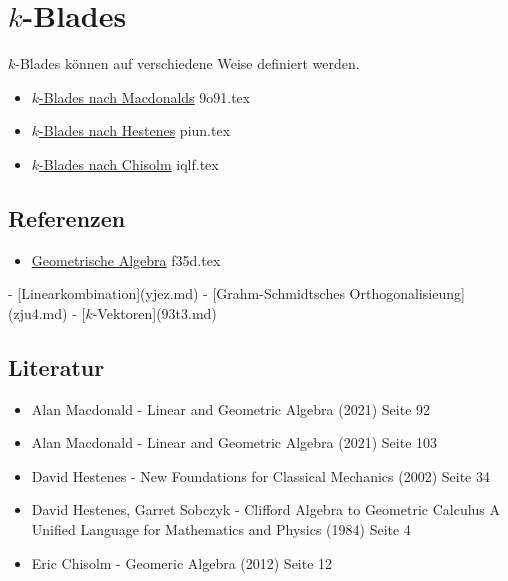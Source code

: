 \documentclass{sajzk}
\begin{document}
\section{\texorpdfstring{$k$-Blades}{k-Blades}}
\label{kikd}

$k$-Blades können auf verschiedene Weise definiert werden.

\begin{itemize}
    \item \href{9o91.pdf}{$k$-Blades nach Macdonalds} 9o91.tex
    \item \href{piun.pdf}{$k$-Blades nach Hestenes} piun.tex
    \item \href{iqlf.pdf}{$k$-Blades nach Chisolm} iqlf.tex
\end{itemize}

\subsection{Referenzen}
\begin{itemize}
    \item \href{f35d.pdf}{Geometrische Algebra} f35d.tex
\end{itemize}
- [Linearkombination](yjez.md)
- [Grahm-Schmidtsches Orthogonalisieung](zju4.md)
- [$k$-Vektoren](93t3.md)

\subsection{Literatur}
\begin{itemize}
    \item Alan Macdonald - Linear and Geometric Algebra (2021) Seite 92
    \item Alan Macdonald - Linear and Geometric Algebra (2021) Seite 103
    \item David Hestenes - New Foundations for Classical Mechanics (2002) Seite 34
    \item David Hestenes, Garret Sobczyk - Clifford Algebra to Geometric Calculus A
          Unified Language for Mathematics and Physics (1984) Seite 4
    \item Eric Chisolm - Geomeric Algebra (2012) Seite 12
    \end{itemize}
\end{document}
